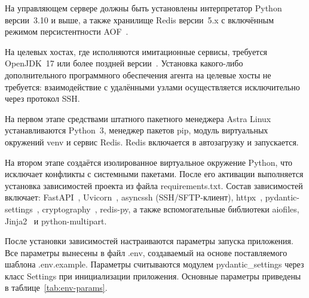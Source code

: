 На управляющем сервере должны быть установлены интерпретатор Python версии~3.10 и выше, а также хранилище Redis версии~5.x с включённым режимом персистентности AOF~\cite{redis-aof}.

На целевых хостах, где исполняются имитационные сервисы, требуется OpenJDK~17 или более поздней версии~\cite{openjdk}. Установка какого-либо дополнительного программного обеспечения агента на целевые хосты не требуется: взаимодействие с удалёнными узлами осуществляется исключительно через протокол SSH.


На первом этапе средствами штатного пакетного менеджера Astra Linux устанавливаются Python~3, менеджер пакетов pip, модуль виртуальных окружений venv и сервис Redis. Redis включается в автозагрузку и запускается.

На втором этапе создаётся изолированное виртуальное окружение Python, что исключает конфликты с системными пакетами. После его активации выполняется установка зависимостей проекта из файла requirements.txt. Состав зависимостей включает: FastAPI~\cite{fastapi}, Uvicorn~\cite{uvicorn}, asyncssh (SSH/SFTP-клиент), httpx~\cite{httpx}, pydantic-settings~\cite{pydantic}, cryptography~\cite{cryptography-fernet}, redis-py, а также вспомогательные библиотеки aiofiles, Jinja2~\cite{jinja2} и python-multipart.


После установки зависимостей настраиваются параметры запуска приложения. Все параметры вынесены в файл .env, создаваемый на основе поставляемого шаблона .env.example. Параметры считываются модулем pydantic\_settings через класс Settings при инициализации приложения. Основные параметры приведены в таблице~\ref{tab:env-params}.

